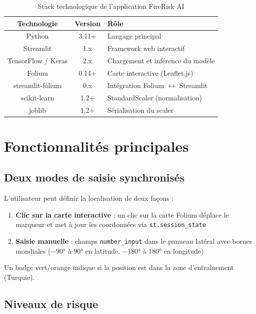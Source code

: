 \documentclass[12pt,a4paper]{report}
\begin{document}
\begin{table}[H]
\centering
\begin{tabular}{|c|c|p{6cm}|}
\hline
\rowcolor{bleu!15}
\textbf{Technologie} & \textbf{Version} & \textbf{R\^{o}le} \\
\hline
Python & 3.11+ & Langage principal \\
\hline
Streamlit & 1.x & Framework web interactif \\
\hline
TensorFlow / Keras & 2.x & Chargement et inf\'{e}rence du mod\`{e}le \\
\hline
Folium & 0.14+ & Carte interactive (Leaflet.js) \\
\hline
streamlit-folium & 0.x & Int\'{e}gration Folium $\leftrightarrow$ Streamlit \\
\hline
scikit-learn & 1.2+ & StandardScaler (normalisation) \\
\hline
joblib & 1.2+ & S\'{e}rialisation du scaler \\
\hline
\end{tabular}
\caption{Stack technologique de l'application FireRisk AI}
\label{tab:stack}
\end{table}

\section{Fonctionnalit\'{e}s principales}

\subsection{Deux modes de saisie synchronis\'{e}s}

L'utilisateur peut d\'{e}finir la localisation de deux fa\c{c}ons :

\begin{enumerate}
    \item \textbf{Clic sur la carte interactive} : un clic sur la carte Folium d\'{e}place le marqueur et met \`{a} jour les coordonn\'{e}es via \texttt{st.session\_state}
    \item \textbf{Saisie manuelle} : champs \texttt{number\_input} dans le panneau lat\'{e}ral avec bornes mondiales ($-90°$ \`{a} $90°$ en latitude, $-180°$ \`{a} $180°$ en longitude)
\end{enumerate}

Un badge vert/orange indique si la position est dans la zone d'entra\^{i}nement (Turquie).

\subsection{Niveaux de risque}
\end{document}

